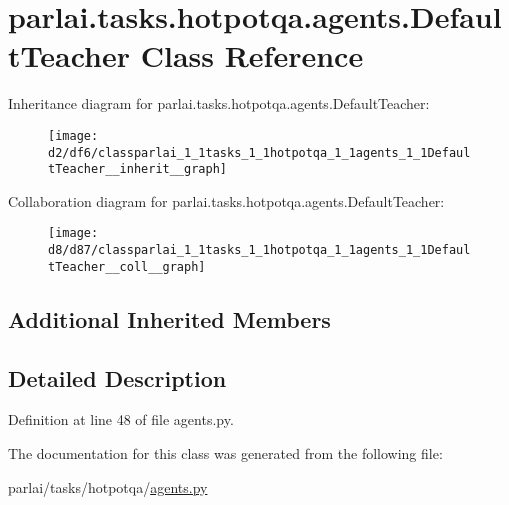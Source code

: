 \hypertarget{classparlai_1_1tasks_1_1hotpotqa_1_1agents_1_1DefaultTeacher}{}\section{parlai.\+tasks.\+hotpotqa.\+agents.\+Default\+Teacher Class Reference}
\label{classparlai_1_1tasks_1_1hotpotqa_1_1agents_1_1DefaultTeacher}


Inheritance diagram for parlai.\+tasks.\+hotpotqa.\+agents.\+Default\+Teacher\+:\nopagebreak
\begin{figure}[H]
\begin{center}
\leavevmode
\texttt{[image: d2/df6/classparlai\_1\_1tasks\_1\_1hotpotqa\_1\_1agents\_1\_1DefaultTeacher\_\_inherit\_\_graph]}
\end{center}
\end{figure}


Collaboration diagram for parlai.\+tasks.\+hotpotqa.\+agents.\+Default\+Teacher\+:\nopagebreak
\begin{figure}[H]
\begin{center}
\leavevmode
\texttt{[image: d8/d87/classparlai\_1\_1tasks\_1\_1hotpotqa\_1\_1agents\_1\_1DefaultTeacher\_\_coll\_\_graph]}
\end{center}
\end{figure}
\subsection*{Additional Inherited Members}


\subsection{Detailed Description}


Definition at line 48 of file agents.\+py.



The documentation for this class was generated from the following file\+:\begin{DoxyCompactItemize}
\item 
parlai/tasks/hotpotqa/\hyperlink{parlai_2tasks_2hotpotqa_2agents_8py}{agents.\+py}\end{DoxyCompactItemize}

